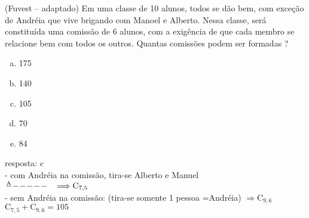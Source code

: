 \begin{ex}
(Fuvest – adaptado) Em uma classe de 10 alunos, todos se dão bem, com exceção de Andréia que vive brigando com Manoel e Alberto. Nessa classe, será constituída uma comissão de 6 alunos, com a exigência de que cada membro se relacione bem com todos os outros. Quantas comissões podem ser formadas ?
    \begin{enumerate}[(a)]
    \item 175
    \item 140
    \item 105
    \item 70
    \item 84
    \end{enumerate}
      \begin{sol}
        resposta: c \\
        - com Andréia na comissão, tira-se Alberto e Manuel \\
        $\frac{\mathrm{A}}{\phantom{A}}\frac{\phantom{A}}{\phantom{A}}\frac{\phantom{A}}{\phantom{A}}\frac{\phantom{A}}{\phantom{A}}\frac{\phantom{A}}{\phantom{A}}\frac{\phantom{A}}{\phantom{A}}\hspace{0.3 cm}\Longrightarrow \mathrm{C}_{7,5}$  \\
        - sem Andréia na comissão: (tira-se somente 1 pessoa =Andréia) $\Longrightarrow \mathrm{C}_{9,6}$ \\
        $\mathrm{C}_{7,5}+\mathrm{C}_{9,6}=105$
      \end{sol}
\end{ex}